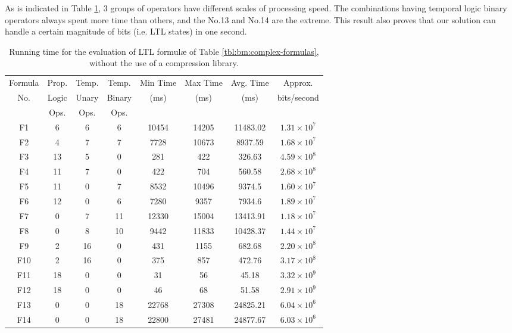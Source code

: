 As is indicated in Table \ref{tbl:bm:complex}, 3 groups of operators have different scales of processing speed. The combinations having temporal logic binary operators always spent more time than others, and the No.13 and No.14 are the extreme. This result also proves that our solution can handle a certain magnitude of bits (i.e. LTL states) in one second. 

\begin{table}[h]
\centering
\begin{tabular}{|c|c|c|c|c|c|c|c|}
\hline
Formula & Prop. & Temp. & Temp. & Min Time & Max Time & Avg. Time & Approx. \\
No. & Logic & Unary & Binary & (ms) & (ms) & (ms) & bits/second \\
& Ops. & Ops. & Ops. & & & & \\
\hline
F1 & 6 & 6 & 6 & 10454 & 14205 & 11483.02 & $1.31 \times 10^7$ \\
\hline
F2 & 4 & 7 & 7 & 7728 & 10673 & 8937.59 & $1.68 \times 10^7$  \\
\hline
F3 & 13 & 5 & 0 & 281 & 422 & 326.63 & $4.59 \times 10^8$  \\
\hline
F4 & 11 & 7 & 0 & 422 & 704 & 560.58 & $2.68 \times 10^8$  \\
\hline
F5 & 11 & 0 & 7 & 8532 & 10496 & 9374.5 & $1.60 \times 10^7$  \\
\hline
F6 & 12 & 0 & 6 & 7280 & 9357 & 7934.6 & $1.89 \times 10^7$  \\
\hline
F7 & 0 & 7 & 11 & 12330 & 15004 & 13413.91 & $1.18 \times 10^7$  \\
\hline
F8 & 0 & 8 & 10 & 9442 & 11833 & 10428.37 & $1.44 \times 10^7$  \\
\hline
F9 & 2 & 16 & 0 & 431 & 1155 & 682.68 & $2.20 \times 10^8$  \\
\hline
F10 & 2 & 16 & 0 & 375 & 857 & 472.76 & $3.17 \times 10^8$  \\
\hline
F11 & 18 & 0 & 0 & 31 & 56 & 45.18 & $3.32 \times 10^9$  \\
\hline
F12 & 18 & 0 & 0 & 46 & 68 & 51.58 & $2.91 \times 10^9$  \\
\hline
F13 & 0 & 0 & 18 & 22768 & 27308 & 24825.21 & $6.04 \times 10^6$  \\
\hline
F14 & 0 & 0 & 18 & 22800 & 27481 & 24877.67 & $6.03 \times 10^6$  \\
\hline
\end{tabular}
\vskip 8pt
\caption{Running time for the evaluation of LTL formul\ae{} of Table \ref{tbl:bm:complex-formulas}, without the use of a compression library.}
\label{tbl:bm:complex}
\end{table}

